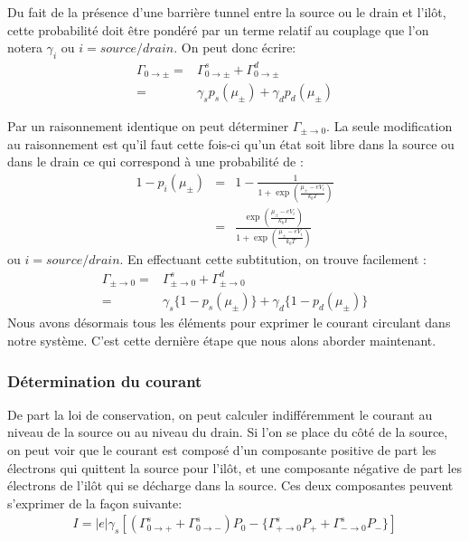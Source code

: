 Du fait de la présence d'une barrière tunnel entre la source ou le drain et l'ilôt, cette probabilité doit être pondéré par un terme relatif au couplage que l'on notera $\gamma_i$ ou $i=source/drain$.
On peut donc écrire:
\begin{eqnarray}
\Gamma_{0 \rightarrow \pm} =& \Gamma_{0 \rightarrow \pm}^s + \Gamma_{0 \rightarrow \pm}^d  \nonumber \\
 =& \gamma_s p_s(\mu_\pm) + \gamma_d p_d(\mu_\pm)
\end{eqnarray}

Par un raisonnement identique on peut déterminer $\Gamma_{\pm \rightarrow 0}$. La seule modification au raisonnement est qu'il faut cette fois-ci qu'un état soit libre dans la source ou dans le drain ce qui correspond à une probabilité de :
\begin{eqnarray}
1 - p_i(\mu_\pm) &=& 1 - \frac{1}{1 + \exp{(\frac{\mu_\pm - eV_i}{k_bT})}} \nonumber \\
 &=& \frac{\exp{(\frac{\mu_\pm - eV_i}{k_bT})}}{1 + \exp{(\frac{\mu_\pm - eV_i}{k_bT})}}
\end{eqnarray}
ou $i=source/drain$.
En effectuant cette subtitution, on trouve facilement :
\begin{eqnarray}
\Gamma_{\pm \rightarrow 0} =& \Gamma_{\pm \rightarrow 0}^s + \Gamma_{\pm \rightarrow 0}^d  \nonumber \\
 =& \gamma_s \{1 - p_s(\mu_\pm)\} + \gamma_d \{1-p_d(\mu_\pm)\}
\end{eqnarray}
Nous avons désormais tous les éléments pour exprimer le courant circulant dans notre système. C'est cette dernière étape que nous alons aborder maintenant.
\subsubsection{Détermination du courant}
De part la loi de conservation, on peut calculer indifféremment le courant au niveau de la source ou au niveau du drain. Si l'on se place du c\^oté de la source, on peut voir que le courant est composé d'un composante positive de part les électrons qui quittent la source pour l'il\^ot, et une composante négative  de part les électrons de l'il\^ot qui se décharge dans la source. Ces deux composantes peuvent s'exprimer de la façon suivante:
\begin{eqnarray}
I = |e| \gamma_s [(\Gamma_{0 \rightarrow +}^s + \Gamma_{0 \rightarrow -}^s) P_0 - \{ \Gamma_{+ \rightarrow 0}^s P_{+} + \Gamma_{- \rightarrow 0}^s P_{-}  \}]
\end{eqnarray}


